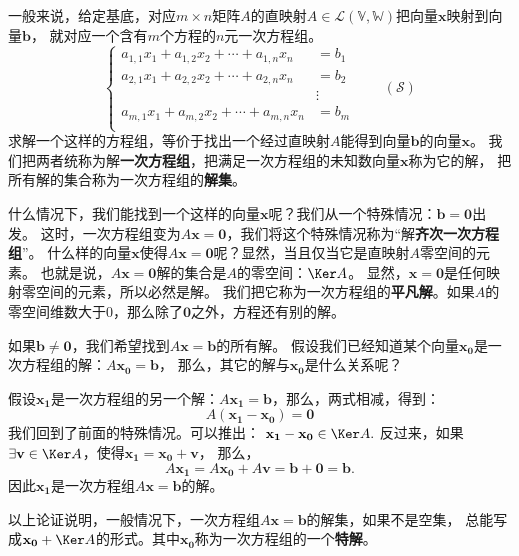 \documentclass[12pt,UTF8,fontset=none]{ctexbook}
\begin{document}
一般来说，给定基底，对应$m\times n$矩阵$A$的直映射$A \in \mathcal{L}(\mathbb{V}, \mathbb{W})$把向量$\mathbf{x}$映射到向量$\mathbf{b}$，
就对应一个含有$m$个方程的$n$元一次方程组。
$$
\left\{
    \begin{aligned}
        a_{1,1} x_1 + a_{1,2} x_2 + \cdots + a_{1,n} x_n &= b_1 \\
        a_{2,1} x_1 + a_{2,2} x_2 + \cdots + a_{2,n} x_n &= b_2 \\
        &\vdots \\
        a_{m,1} x_1 + a_{m,2} x_2 + \cdots + a_{m,n} x_n &= b_m \\
    \end{aligned}
\right.\qquad (\mathcal{S})
$$
求解一个这样的方程组，等价于找出一个经过直映射$A$能得到向量$\mathbf{b}$的向量$\mathbf{x}$。
我们把两者统称为解\textbf{一次方程组}，把满足一次方程组的未知数向量$\mathbf{x}$称为它的解，
把所有解的集合称为一次方程组的\textbf{解集}。

什么情况下，我们能找到一个这样的向量$\mathbf{x}$呢？我们从一个特殊情况：$\mathbf{b} = \mathbf{0}$出发。
这时，一次方程组变为$A\mathbf{x} = \mathbf{0}$，我们将这个特殊情况称为“解\textbf{齐次一次方程组}”。
什么样的向量$\mathbf{x}$使得$A\mathbf{x} = \mathbf{0}$呢？显然，当且仅当它是直映射$A$零空间的元素。
也就是说，$A\mathbf{x} = \mathbf{0}$解的集合是$A$的零空间：$\Ker A$。
显然，$\mathbf{x} = \mathbf{0}$是任何映射零空间的元素，所以必然是解。
我们把它称为一次方程组的\textbf{平凡解}。如果$A$的零空间维数大于0，那么除了$\mathbf{0}$之外，方程还有别的解。

如果$\mathbf{b} \neq \mathbf{0}$，我们希望找到$A\mathbf{x} = \mathbf{b}$的所有解。
假设我们已经知道某个向量$\mathbf{x_0}$是一次方程组的解：$A\mathbf{x_0} = \mathbf{b}$，
那么，其它的解与$\mathbf{x_0}$是什么关系呢？

假设$\mathbf{x_1}$是一次方程组的另一个解：$A\mathbf{x_1} = \mathbf{b}$，那么，两式相减，得到：
$$A(\mathbf{x_1} - \mathbf{x_0}) = \mathbf{0}$$
我们回到了前面的特殊情况。可以推出：
$ \mathbf{x_1} - \mathbf{x_0} \in \Ker A.$
反过来，如果$\exists \mathbf{v} \in \Ker A$，使得$\mathbf{x_1} = \mathbf{x_0} + \mathbf{v}$，
那么，
$$A\mathbf{x_1} = A\mathbf{x_0} + A\mathbf{v} = \mathbf{b} + \mathbf{0} = \mathbf{b}.$$
因此$\mathbf{x_1}$是一次方程组$A\mathbf{x} = \mathbf{b}$的解。

以上论证说明，一般情况下，一次方程组$A\mathbf{x} = \mathbf{b}$的解集，如果不是空集，
总能写成$\mathbf{x_0} + \Ker A$的形式。其中$\mathbf{x_0}$称为一次方程组的一个\textbf{特解}。
\end{document}
